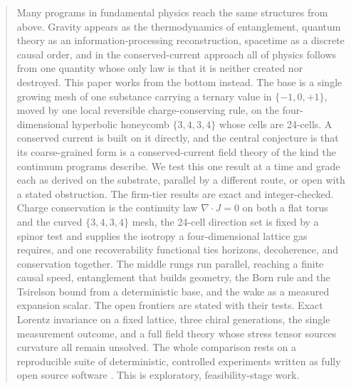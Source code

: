 \begin{abstract}
Many programs in fundamental physics reach the same structures from above. Gravity appears as the thermodynamics
of entanglement, quantum theory as an information-processing reconstruction, spacetime as a discrete causal order,
and in the conserved-current approach all of physics follows from one quantity whose only law is that
it is neither created nor destroyed. This paper works from the bottom instead. The base is a single growing mesh of one substance
carrying a ternary value in $\{-1,0,+1\}$, moved by one local reversible charge-conserving rule, on the
four-dimensional hyperbolic honeycomb $\{3,4,3,4\}$ whose cells are 24-cells. A conserved current is built on it
directly, and the central conjecture is that its coarse-grained form is a conserved-current field theory of the
kind the continuum programs describe. We test this one result at a time and grade each as derived on the substrate,
parallel by a different route, or open with a stated obstruction. The firm-tier results are exact and integer-checked.
Charge conservation is the continuity law $\nabla\!\cdot J = 0$ on both a flat torus and the curved $\{3,4,3,4\}$
mesh, the 24-cell direction set is fixed by a spinor test and supplies the isotropy a four-dimensional lattice gas
requires, and one recoverability functional ties horizons, decoherence, and conservation together. The middle
rungs run parallel, reaching a finite causal speed, entanglement that builds geometry, the Born rule and the
Tsirelson bound from a deterministic base, and the wake as a measured expansion scalar. The open frontiers are
stated with their tests. Exact Lorentz invariance on a fixed lattice, three chiral generations, the single
measurement outcome, and a full field theory whose stress tensor sources curvature all remain unsolved. The whole
comparison rests on a reproducible suite of deterministic, controlled experiments written as fully open source software
\cite{cluesurf2026repo}. This is exploratory, feasibility-stage work.
\end{abstract}
